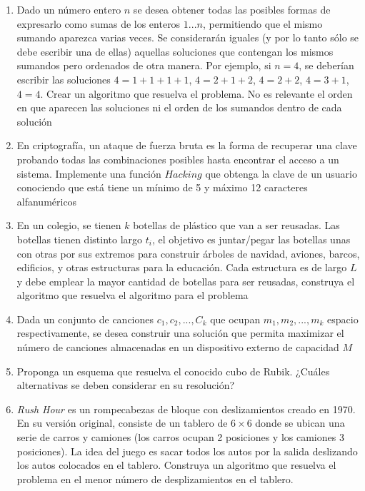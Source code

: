 \begin{enumerate}
\item Dado un número entero $n$ se desea obtener todas las posibles formas de expresarlo como sumas de los enteros $1...n$, permitiendo que el mismo sumando aparezca varias veces. Se considerarán iguales (y por lo tanto sólo se debe escribir una de ellas) aquellas soluciones que contengan los mismos sumandos pero ordenados de otra manera. Por ejemplo, si $n = 4$, se deberían escribir las soluciones $4=1+1+1+1$, $4=2+1+2$, $4=2+2$, $4=3+1$, $4=4$. Crear un algoritmo que resuelva el problema. No es relevante el orden en que aparecen las soluciones ni el orden de los sumandos dentro de cada solución
\item En criptografía, un ataque de fuerza bruta es la forma de recuperar una clave probando todas las combinaciones posibles hasta encontrar el acceso a un sistema. Implemente una función $Hacking$ que obtenga la clave de un usuario conociendo que está tiene un mínimo de 5 y máximo 12 caracteres alfanuméricos
\item En un colegio, se tienen $k$ botellas de plástico que van a ser reusadas. Las botellas tienen distinto largo $t_i$, el objetivo es juntar/pegar las botellas unas con otras por sus extremos para construir árboles de navidad, aviones, barcos, edificios, y otras estructuras para la educación. Cada estructura es de largo $L$ y debe emplear la mayor cantidad de botellas para ser reusadas, construya el algoritmo que resuelva el algoritmo para el problema
\item Dada un conjunto de canciones $c_1, c_2, ..., C_k$ que ocupan $m_1, m_2, ..., m_k$ espacio respectivamente, se desea construir una solución que permita maximizar el número de canciones almacenadas en un dispositivo externo de capacidad $M$
\item Proponga un esquema que resuelva el conocido cubo de Rubik. ¿Cuáles alternativas se deben considerar en su resolución?
\item \textit{Rush Hour} es un rompecabezas de bloque con deslizamientos creado en 1970. En su versión original, consiste de un tablero de $6 \times 6$ donde se ubican una serie de carros y camiones (los carros ocupan 2 posiciones y los camiones 3 posiciones). La idea del juego es sacar todos los autos por la salida deslizando los autos colocados en el tablero. Construya un algoritmo que resuelva el problema en el menor número de desplizamientos en el tablero.
\end{enumerate}
